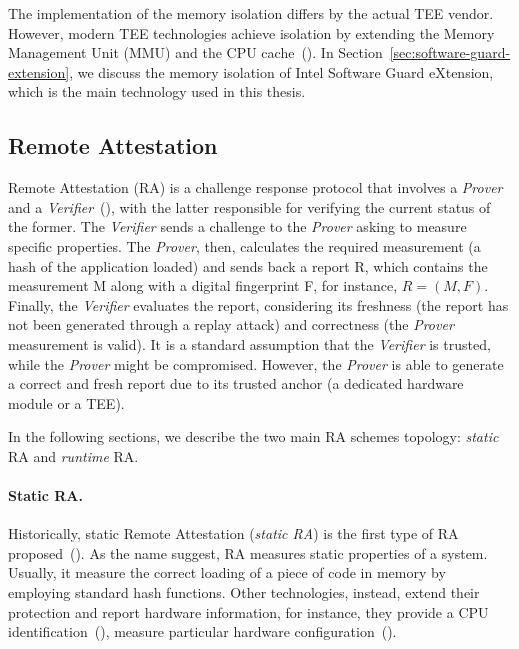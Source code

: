 The implementation of the memory isolation differs by the actual TEE vendor.
However, modern TEE technologies achieve isolation by extending the Memory 
Management Unit (MMU) and the CPU 
cache~(\cite{winter2008trusted,gilmont1999enhancing,rozas2013intel}).
In Section~\ref{sec:software-guard-extension}, we discuss the memory isolation 
of Intel Software Guard eXtension, which is the main technology 
used in this thesis.
                 

\subsection{Remote Attestation}
\label{ssec:remote-attestation}

Remote Attestation (RA) is a challenge response protocol that involves a 
\emph{Prover} and a \emph{Verifier}~(\cite{bajikar2002trusted}), with the 
latter responsible for verifying the current status of the former. 
The \emph{Verifier} sends a challenge to the \emph{Prover} asking to 
measure specific properties. The \emph{Prover}, then, calculates the required 
measurement (\eg a hash of the application loaded) and sends back a report R, 
which contains the measurement M along with a digital fingerprint F, for 
instance, $R = (M,F)$. Finally, the \emph{Verifier} evaluates the report, 
considering its freshness (\ie the report has not been generated through a 
replay attack) and correctness (\ie the \emph{Prover} measurement is valid). It 
is a standard assumption that the \emph{Verifier} is trusted, while the 
\emph{Prover} 
might be compromised. However, the \emph{Prover} is able to generate a correct 
and fresh report due to its trusted anchor (\eg a dedicated hardware module or 
a TEE).

In the following sections, we describe the two main RA schemes topology: 
\emph{static} RA and \emph{runtime} RA.

\paragraph{Static RA.}
Historically, static Remote Attestation (\emph{static RA}) is the first type of 
RA proposed~(\cite{bajikar2002trusted}).
As the name suggest, RA measures static properties of a system. 
Usually, it measure the correct loading of a piece of code in memory by 
employing standard hash functions.
Other technologies, instead, extend their protection and report hardware 
information, for instance, they provide a CPU 
identification~(\cite{anati2013innovative}), measure particular hardware 
configuration~(\cite{sailer2004design}).

